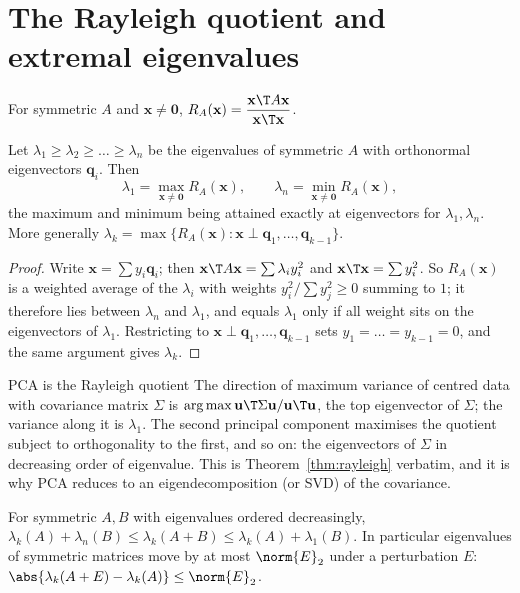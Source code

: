 \section{The Rayleigh quotient and extremal eigenvalues}

\begin{definition}
For symmetric $A$ and $\mathbf{x}\ne\mathbf{0}$, $R_A(\mathbf{x})=\dfrac{\mathbf{x}\T A\mathbf{x}}{\mathbf{x}\T\mathbf{x}}$.
\end{definition}

\begin{theorem}\label{thm:rayleigh}
Let $\lambda_{1}\ge\lambda_2\ge\dots\ge\lambda_n$ be the eigenvalues of symmetric $A$ with orthonormal eigenvectors $\mathbf{q}_i$. Then
\[ \lambda_1=\max_{\mathbf{x}\ne\mathbf{0}}R_A(\mathbf{x}),\qquad\lambda_n=\min_{\mathbf{x}\ne\mathbf{0}}R_A(\mathbf{x}), \]
the maximum and minimum being attained exactly at eigenvectors for $\lambda_1,\lambda_n$. More generally $\lambda_k=\max\{R_A(\mathbf{x}):\mathbf{x}\perp\mathbf{q}_1,\dots,\mathbf{q}_{k-1}\}$.
\end{theorem}

\begin{proof}
Write $\mathbf{x}=\sum y_i\mathbf{q}_i$; then $\mathbf{x}\T A\mathbf{x}=\sum\lambda_iy_i^2$ and $\mathbf{x}\T\mathbf{x}=\sum y_i^2$. So $R_A(\mathbf{x})$ is a weighted average of the $\lambda_i$ with weights $y_i^2/\sum y_j^2\ge0$ summing to $1$; it therefore lies between $\lambda_n$ and $\lambda_1$, and equals $\lambda_1$ only if all weight sits on the eigenvectors of $\lambda_1$. Restricting to $\mathbf{x}\perp\mathbf{q}_1,\dots,\mathbf{q}_{k-1}$ sets $y_1=\dots=y_{k-1}=0$, and the same argument gives $\lambda_k$.
\end{proof}

\begin{interview}{PCA is the Rayleigh quotient}
The direction of maximum variance of centred data with covariance matrix $\Sigma$ is $\arg\max\mathbf{u}\T\Sigma\mathbf{u}/\mathbf{u}\T\mathbf{u}$, the top eigenvector of $\Sigma$; the variance along it is $\lambda_1$. The second principal component maximises the quotient subject to orthogonality to the first, and so on: the eigenvectors of $\Sigma$ in decreasing order of eigenvalue. This is Theorem~\ref{thm:rayleigh} verbatim, and it is why PCA reduces to an eigendecomposition (or SVD) of the covariance.
\end{interview}

\begin{theorem}\label{thm:weyl}
For symmetric $A,B$ with eigenvalues ordered decreasingly, $\lambda_k(A)+\lambda_n(B)\le\lambda_k(A+B)\le\lambda_k(A)+\lambda_1(B)$. In particular eigenvalues of symmetric matrices move by at most $\norm{E}_2$ under a perturbation $E$: $\abs{\lambda_k(A+E)-\lambda_k(A)}\le\norm{E}_2$.
\end{theorem}

